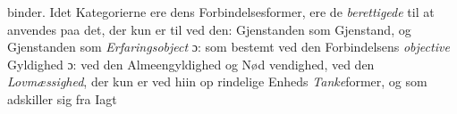 \documentclass[12pt,a4paper]{book}
\begin{document}
binder. Idet Kategorierne ere dens Forbindelsesformer, ere
de \emph{berettigede} til at anvendes paa det, der kun er til
ved den: Gjenstanden som Gjenstand, og Gjenstanden som
\emph{Erfaringsobject} ɔ: som bestemt ved den Forbindelsens
\setcounter{footnote}{0}%
\emph{objective} Gyldighed ɔ: ved den Almeengyldighed og Nød\-%
vendighed, ved den \emph{Lovmæssighed}, der kun er ved hiin op\-%
rindelige Enheds \emph{Tanke}former, og som adskiller sig fra Iagt\-%
\end{document}
